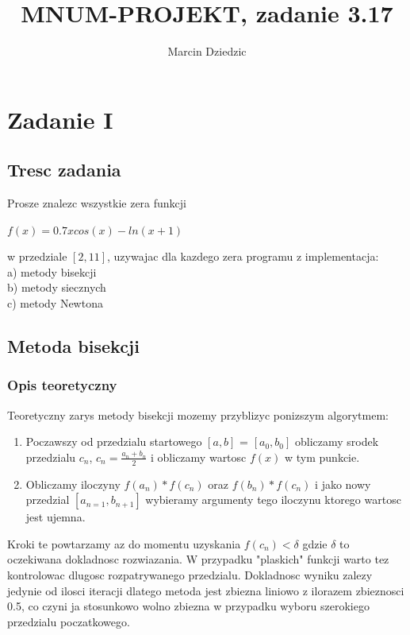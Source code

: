 \documentclass[polish, 11pt, oneside]{article}   	%
\title{MNUM-PROJEKT, zadanie 3.17}
\author{Marcin Dziedzic}
\begin{document}
\maketitle{}
\tableofcontents
\section{Zadanie I}
\subsection{Tresc zadania}
Prosze znalezc wszystkie zera funkcji
\begin{center}
$f(x) = 0.7xcos(x)-ln(x+1)$
\end{center}
w przedziale $[2,11]$, uzywajac dla kazdego zera programu z implementacja:\\
a) metody bisekcji\\
b) metody siecznych\\
c) metody Newtona\\

\subsection{Metoda bisekcji}
\subsubsection{Opis teoretyczny}
Teoretyczny zarys metody bisekcji mozemy przyblizyc ponizszym algorytmem:
\begin{enumerate}
  \item Poczawszy od przedzialu startowego $[a,b]$ = $[a_{0},b_{0}]$ obliczamy srodek przedzialu $c_{n}$,
  	$c_{n} = \frac{a_{n}+b_{n}}{2}$
  i obliczamy wartosc $f(x)$ w tym punkcie. 
  \item Obliczamy iloczyny $f(a_{n})*f(c_{n})$ oraz $f(b_{n})*f(c_{n})$ i jako nowy przedzial $[a_{n=1},b_{n+1}]$
  wybieramy argumenty tego iloczynu ktorego wartosc jest ujemna. 
\end{enumerate} 
Kroki te powtarzamy az do momentu uzyskania $f(c_{n})<\delta$ gdzie $\delta$ to oczekiwana dokladnosc rozwiazania. W przypadku "plaskich"  funkcji warto tez kontrolowac dlugosc rozpatrywanego przedzialu. 
Dokladnosc wyniku zalezy jedynie od ilosci iteracji dlatego metoda jest zbiezna liniowo z ilorazem zbieznosci 0.5, co czyni ja stosunkowo wolno zbiezna w przypadku wyboru szerokiego przedzialu poczatkowego. 
\end{document}
